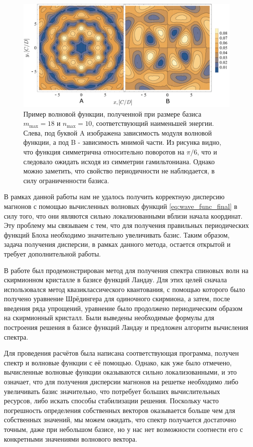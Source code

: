 \documentclass[a4paper,article,14pt]{extarticle}
\begin{document}
\begin{figure}[t]
\centering	
\includegraphics[width=1.03\columnwidth]{images/eigenfunc.pdf}
\caption{Пример волновой функции, полученной при размере базиса $m_\text{max}=18$ и $n_\text{max}=10$, соответствующий наименьшей энергии. Слева, под буквой A изображена зависимость модуля волновой функции, а под B - зависимость мнимой части. Из рисунка видно, что функция симметрична относительно поворотов на $\pi/6$, что и следовало ожидать исходя из симметрии гамильтониана. Однако можно заметить, что свойство периодичности не наблюдается, в силу ограниченности базиса. }
\label{fig:landau_eigenfunction}
\end{figure}


В рамках данной работы нам не удалось получить корректную дисперсию магнонов с помощью вычисленных волновых функций \eqref{eq:wave_func_final} в силу того, что они являются сильно локализованными вблизи начала координат. Эту проблему мы связываем с тем, что для получения правильных периодических функций Блоха необходимо значительно увеличивать базис. Таким образом, задача получения дисперсии, в рамках данного метода, остается открытой и требует дополнительной работы.


\pagebreak
{}

В работе был продемонстрирован метод для получения спектра спиновых волн на скирмионном кристалле в базисе функций Ландау. Для этих целей сначала использовался метод квазиклассического квантования, с помощью которого было получено уравнение Шрёдингера для одиночного скирмиона, а затем, после введения ряда упрощений, уравнение было продолжено периодическим образом на скирмионный кристалл. Были выведены необходимые формулы для построения решения в базисе функций Ландау и предложен алгоритм вычисления спектра.

Для проведения расчётов была написана соответствующая программа, получен спектр и волновые функции с её помощью. Однако, как уже было отмечено, вычисленные волновые функции оказываются сильно локализованными, и это означает, что для получения дисперсии магнонов на решетке необходимо либо увеличивать базис значительно, что потребует больших вычислительных ресурсов, либо искать способы стабилизации решения. Поскольку часто погрешность определения собственных векторов оказывается больше чем для собственных значений, мы можем ожидать, что спектр получается достаточно точным, даже при небольшом базисе, но у нас нет возможности соотнести его с конкретными значениями волнового вектора.
\end{document}

